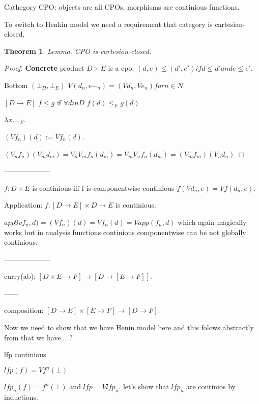 \documentclass[a4paper,10pt]{book}
\newtheorem{theorem}{Theorem}
\newcommand{\rarr}{ \rightarrow }
\begin{document}
Cathegory CPO: objects are all CPOs, morphisms are continious functions.

To switch to Henkin model we need a requirement that category is cartesian-closed.

\begin{theorem}
Lemma. CPO is cartesion-closed. 
\end{theorem}
\begin{proof}
 \textbf{Concrete} product  $D\times E$ is a cpo. $(d,e) \leq (d',e') if d\leq d' and e\leq e'$.
 
 Bottom $(\bot_D,\bot_E)$ $V(d_n,e-_n) = (Vd_n,Ve_n) for n \in N$

 
 $[D\rarr E]$   $f\leq g$ if $\forall d in D$ $f(d) \leq_E g(d)$
 
 $\lambda x . \bot_E$.
 
 $(V f_n)(d) := Vf_n(d)$.
 
 $(V_nf_n)(V_md_m) = V_nV_m f_n(d_m) = V_mV_n f_n(d_m) = (V_mf_m)(V_nd_n)$
\end{proof}
 
 --------------------
 
 $f: D \times E$ is continious iff f is componentwise continious $f(Vd_n, e) = Vf(d_n,e)$.
 
 Application: $f: [D \rarr E] \times D \rarr E$ is continious.
 
 $app 9vf_n,d) = (Vf_n)(d) = Vf_n(d) = Vapp(f_n,d)$ which again magically works but in 
 analysis functions continious componentwise can be not globally continious.
 
 --------------------

 curry(ab): $[D\times E \rarr F] \rarr [D\rarr [E\rarr F]]$.
 
 ------

 composition: $[D\rarr E] \times [E \rarr F] \rarr [D\rarr F]$.
 
 
 Now we need to show that we have Henin model here and this folows abstractly from that we  have... ?
 
 lfp continious
 
 $lfp(f) = V f^n(\bot)$
 
 $lfp_n(f) = f^n(\bot)$ and $lfp = Vlfp_n$. let's show that $lfp_n$ are continios by inductions.
 
\end{document}
